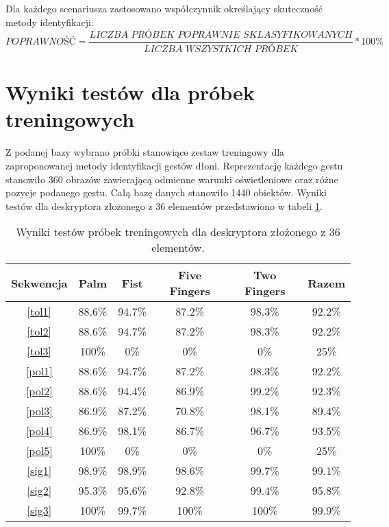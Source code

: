 Dla każdego scenariusza zastosowano współczynnik określający skuteczność metody identyfikacji:
\begin{equation}
\textit{POPRAWNOŚĆ} = \frac{\textit{LICZBA PRÓBEK POPRAWNIE SKLASYFIKOWANYCH}}{\textit{LICZBA WSZYSTKICH PRÓBEK}} * \textit{100\%}
\end{equation}


\section{Wyniki testów dla próbek treningowych}
Z podanej bazy wybrano próbki stanowiące zestaw treningowy dla zaproponowanej metody identyfikacji gestów dłoni. Reprezentację każdego gestu stanowiło 360 obrazów zawierającą odmienne warunki oświetleniowe oraz różne pozycje podanego gestu. Całą bazę danych stanowiło 1440 obiektów. Wyniki testów dla deskryptora złożonego z 36 elementów przedstawiono w tabeli \ref{tab: train36}.

\begin{table} [h!]
	\centering
	\begin{tabular}{|c|c|c|c|c|c|}
		\hline
		\textbf{Sekwencja} 	& \textbf{Palm} & \textbf{Fist} & \textbf{Five Fingers} & \textbf{Two Fingers} & \textbf{Razem} \\ \hline
		\ref{tol1} 	& 88.6\% 		& 94.7\%		& 87.2\%	& 98.3\% 	& 92.2\% \\ \hline
		\ref{tol2} 	& 88.6\% 		& 94.7\%		& 87.2\%	& 98.3\% 	& 92.2\% \\ \hline
		\ref{tol3}	& 100\%			& 0\%			& 0\%		& 0\% 		& 25\% \\ \hline \hline
		\ref{pol1} 	& 88.6\% 		& 94.7\%		& 87.2\%	& 98.3\% 	& 92.2\% \\ \hline
		\ref{pol2} 	& 88.6\% 		& 94.4\%		& 86.9\%	& 99.2\% 	& 92.3\% \\ \hline
		\ref{pol3}	& 86.9\%		& 87.2\%		& 70.8\%	& 98.1\% 	& 89.4\% \\ \hline
		\ref{pol4}	& 86.9\%		& 98.1\%		& 86.7\%	& 96.7\% 	& 93.5\% \\ \hline
		\ref{pol5}	& 100\%			& 0\%			& 0\%		& 0\% 		& 25\% \\ \hline \hline
		\ref{sig1}	& 98.9\% 		& 98.9\%		& 98.6\%	& 99.7\% 	& 99.1\% \\ \hline
		\ref{sig2}	& 95.3\% 		& 95.6\%		& 92.8\%	& 99.4\% 	& 95.8\% \\ \hline
		\ref{sig3}	& 100\%			& 99.7\%		& 100\%		& 100\% 	& 99.9\% \\ \hline
	\end{tabular}
	\caption{Wyniki testów próbek treningowych dla deskryptora złożonego z 36 elementów.}
	\label{tab: train36}
\end{table}

